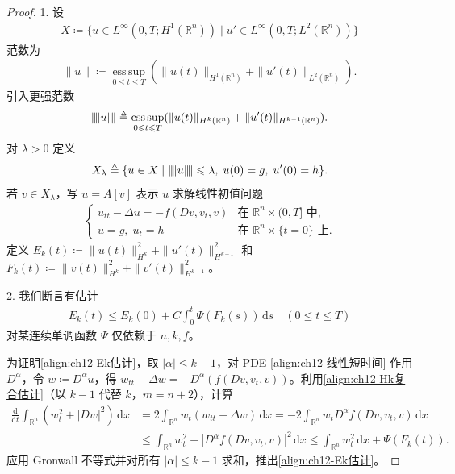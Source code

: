 \documentclass[../../main.tex]{subfiles}
\begin{document}
\begin{proof}
1. 设
\begin{align*}
X\coloneqq\{u\in L^\infty(0,T;H^1(\mathbb{R}^n))\mid u'\in L^\infty(0,T;L^2(\mathbb{R}^n))\}
\end{align*}
范数为
\begin{align*}
\|u\|\coloneqq\operatorname*{ess\,sup}_{0\leqslant t\leqslant T}(\|u(t)\|_{H^1(\mathbb{R}^n)}+\|u'(t)\|_{L^2(\mathbb{R}^n)}).
\end{align*}
引入更强范数
\begin{align*}
\|\!\| u\|\!\|\triangleq\operatorname*{ess\,sup}_{0\leqslant t\leqslant T}(\|u(t)\|_{H^k(\mathbb{R}^n)}+\|u'(t)\|_{H^{k-1}(\mathbb{R}^n)}).
\end{align*}
对 $\lambda>0$ 定义
\begin{align*}
X_\lambda\triangleq\{u\in X\mid\|\!\| u\|\!\|\leqslant\lambda,\;u(0)=g,\;u'(0)=h\}.
\end{align*}
若 $v\in X_\lambda$，写 $u=A[v]$ 表示 $u$ 求解线性初值问题
\begin{align}
\begin{cases}
u_{tt}-\Delta u=-f(Dv,v_t,v) & \text{在 } \mathbb{R}^n\times(0,T] \text{ 中},\\
u=g,\;u_t=h & \text{在 } \mathbb{R}^n\times\{t=0\} \text{ 上}.
\end{cases}
\label{align:ch12-线性短时间}
\end{align}
定义 $E_k(t)\coloneqq\|u(t)\|_{H^k}^2+\|u'(t)\|_{H^{k-1}}^2$ 和 $F_k(t)\coloneqq\|v(t)\|_{H^k}^2+\|v'(t)\|_{H^{k-1}}^2$。

2. 我们断言有估计
\begin{align}
E_k(t)\leqslant E_k(0)+C\int_0^t\Psi(F_k(s))\,\mathrm{d}s \quad (0\leqslant t\leqslant T)
\label{align:ch12-Ek估计}
\end{align}
对某连续单调函数 $\Psi$ 仅依赖于 $n,k,f$。

为证明\eqref{align:ch12-Ek估计}，取 $|\alpha|\leqslant k-1$，对 PDE \eqref{align:ch12-线性短时间} 作用 $D^\alpha$，令 $w\coloneqq D^\alpha u$，得 $w_{tt}-\Delta w=-D^\alpha(f(Dv,v_t,v))$。利用\eqref{align:ch12-Hk复合估计}（以 $k-1$ 代替 $k$，$m=n+2$），计算
\begin{align*}
\frac{\mathrm{d}}{\mathrm{d}t}\int_{\mathbb{R}^n}(w_t^2+|Dw|^2)\,\mathrm{d}x
&=2\int_{\mathbb{R}^n}w_t(w_{tt}-\Delta w)\,\mathrm{d}x
=-2\int_{\mathbb{R}^n}w_tD^\alpha f(Dv,v_t,v)\,\mathrm{d}x\\
&\leqslant\int_{\mathbb{R}^n}w_t^2+|D^\alpha f(Dv,v_t,v)|^2\,\mathrm{d}x
\leqslant\int_{\mathbb{R}^n}w_t^2\,\mathrm{d}x+\Psi(F_k(t)).
\end{align*}
应用 Gronwall 不等式并对所有 $|\alpha|\leqslant k-1$ 求和，推出\eqref{align:ch12-Ek估计}。


\end{proof}
\end{document}
